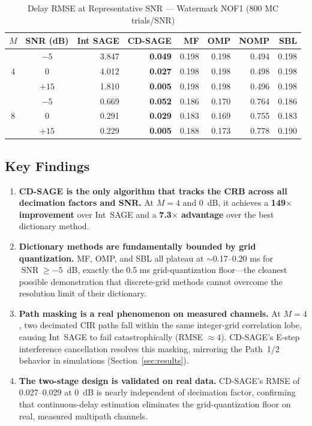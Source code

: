 \documentclass[a4paper,fleqn]{cas-dc}
\DeclareMathOperator{\SNR}{SNR}
\begin{document}
\begin{table}[width=.9\linewidth,cols=8,pos=h]
\centering
\caption{Delay RMSE at Representative SNR --- Watermark NOF1 (800 MC trials/SNR)}
\label{tab:wm}
\footnotesize
\begin{tabular*}{\tblwidth}{@{}ccrrrrrr@{}}
\toprule
$M$ & SNR (dB) & Int SAGE & \textbf{CD-SAGE} & MF & OMP & NOMP & SBL \\
\midrule
\multirow{3}{*}{4} & $-5$  & 3.847 & \textbf{0.049} & 0.198 & 0.198 & 0.494 & 0.198 \\
                    & $0$   & 4.012 & \textbf{0.027} & 0.198 & 0.198 & 0.498 & 0.198 \\
                    & $+15$ & 1.810 & \textbf{0.005} & 0.198 & 0.198 & 0.496 & 0.198 \\
\midrule
\multirow{3}{*}{8} & $-5$  & 0.669 & \textbf{0.052} & 0.186 & 0.170 & 0.764 & 0.186 \\
                    & $0$   & 0.291 & \textbf{0.029} & 0.183 & 0.169 & 0.755 & 0.183 \\
                    & $+15$ & 0.229 & \textbf{0.005} & 0.188 & 0.173 & 0.778 & 0.190 \\
\bottomrule
\end{tabular*}
\end{table}

\subsection{Key Findings}

\begin{enumerate}
\item \textbf{CD-SAGE is the only algorithm that tracks the CRB across all decimation factors and SNR.} At $M=4$ and \SI{0}{dB}, it achieves a \textbf{149$\times$ improvement} over Int~SAGE and a \textbf{7.3$\times$ advantage} over the best dictionary method.
\item \textbf{Dictionary methods are fundamentally bounded by grid quantization.} MF, OMP, and SBL all plateau at $\sim$0.17--0.20 ms for $\SNR \ge -5$~dB, exactly the 0.5 ms grid-quantization floor---the cleanest possible demonstration that discrete-grid methods cannot overcome the resolution limit of their dictionary.
\item \textbf{Path masking is a real phenomenon on measured channels.} At $M=4$, two decimated CIR paths fall within the same integer-grid correlation lobe, causing Int~SAGE to fail catastrophically (RMSE $\approx 4$). CD-SAGE's E-step interference cancellation resolves this masking, mirroring the Path~1/2 behavior in simulations (Section~\ref{sec:results}).
\item \textbf{The two-stage design is validated on real data.} CD-SAGE's RMSE of 0.027--0.029 at \SI{0}{dB} is nearly independent of decimation factor, confirming that continuous-delay estimation eliminates the grid-quantization floor on real, measured multipath channels.
\end{enumerate}
\end{document}
